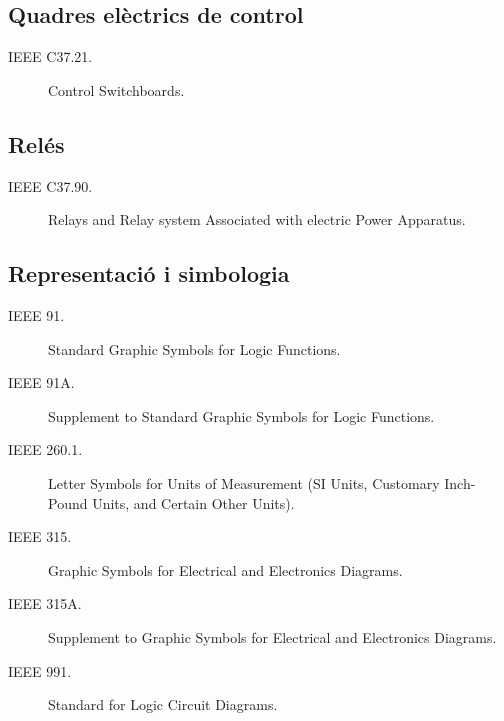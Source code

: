 \subsection*{Quadres elèctrics de control}
\begin{description}
    \item [\hspace{5mm}IEEE C37.21.] Control Switchboards.
\end{description}


\subsection*{Relés}
\begin{description}
    \item [\hspace{5mm}IEEE C37.90.] Relays and Relay system Associated with electric Power Apparatus.
\end{description}


\subsection*{Representació i simbologia}
\begin{description}
    \item [\hspace{5mm}IEEE 91.] Standard Graphic Symbols for Logic Functions.
    \item [\hspace{5mm}IEEE 91A.] Supplement to Standard Graphic Symbols for Logic Functions.
    \item [\hspace{5mm}IEEE 260.1.] Letter Symbols for Units of Measurement (SI Units, Customary Inch-Pound Units, and Certain Other Units).
    \item [\hspace{5mm}IEEE 315.] Graphic Symbols for Electrical and Electronics Diagrams.
    \item [\hspace{5mm}IEEE 315A.] Supplement to Graphic Symbols for Electrical and Electronics Diagrams.
    \item [\hspace{5mm}IEEE 991.] Standard for Logic Circuit Diagrams.
\end{description}

